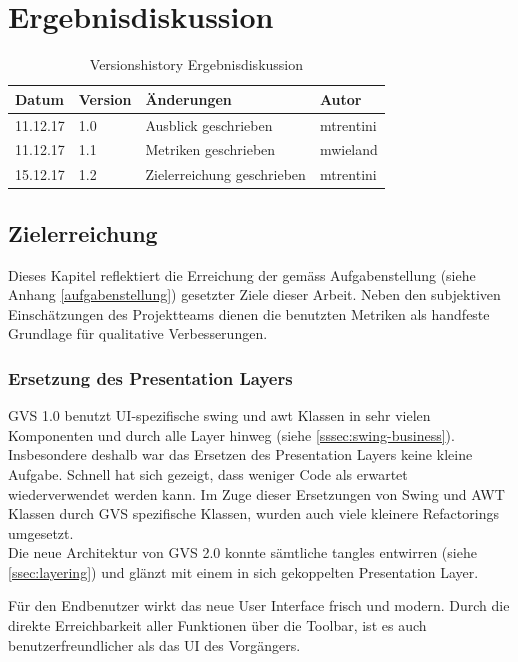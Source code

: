 \documentclass[11pt,a4paper,english,oneside]{book}
\numberwithin{equation}{chapter}
\begin{document}
	

	\chapter{Ergebnisdiskussion} \label{ch:ergebnisse}
	\begin{table}[h!]
		\centering
		\begin{tabularx}{\linewidth}{l l X l}
			\toprule 
			Datum & Version & Änderungen & Autor \\
			\midrule
			11.12.17 & 1.0 & Ausblick geschrieben & mtrentini \\
			11.12.17 & 1.1 & Metriken geschrieben & mwieland \\
			15.12.17 & 1.2 & Zielerreichung geschrieben & mtrentini \\
			\bottomrule 
		\end{tabularx} 
		\caption{Versionshistory Ergebnisdiskussion} 
	\end{table}	
	
	
	
	\section{Zielerreichung}
	Dieses Kapitel reflektiert die Erreichung der gemäss Aufgabenstellung (siehe Anhang \ref{aufgabenstellung}) gesetzter Ziele dieser Arbeit. Neben den subjektiven Einschätzungen des Projektteams dienen die benutzten Metriken als handfeste Grundlage für qualitative Verbesserungen.
	
	\subsection{Ersetzung des Presentation Layers}
	GVS 1.0 benutzt UI-spezifische \gls{swing} und \gls{awt} Klassen in sehr vielen Komponenten und durch alle Layer hinweg (siehe \ref{sssec:swing-business}). Insbesondere deshalb war das Ersetzen des Presentation Layers keine kleine Aufgabe. Schnell hat sich gezeigt, dass weniger Code als erwartet wiederverwendet werden kann. Im Zuge dieser Ersetzungen von Swing und AWT Klassen durch GVS spezifische Klassen, wurden auch viele kleinere Refactorings umgesetzt.\\
	Die neue Architektur von GVS 2.0 konnte sämtliche \glspl{tangle} entwirren (siehe \ref{ssec:layering}) und glänzt mit einem in sich gekoppelten Presentation Layer.
	
	Für den Endbenutzer wirkt das neue User Interface frisch und modern. Durch die direkte Erreichbarkeit aller Funktionen über die Toolbar, ist es auch benutzerfreundlicher als das UI des Vorgängers.
	
\end{document}
